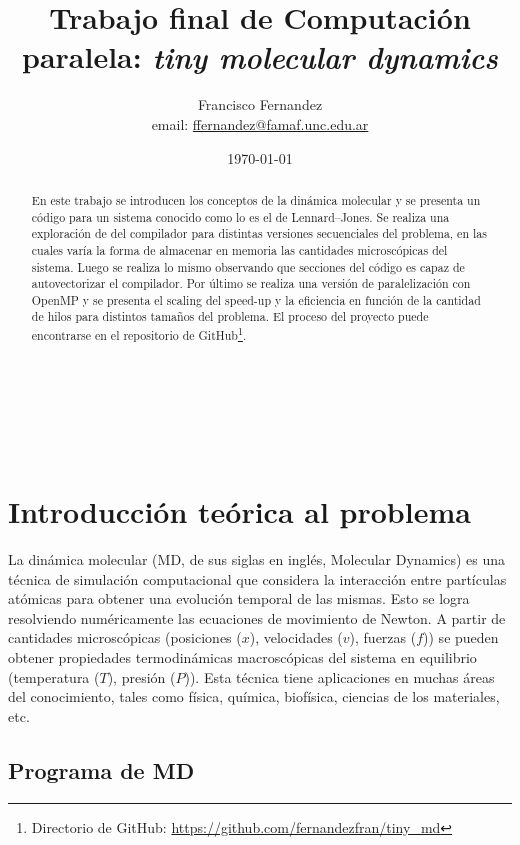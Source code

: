 \documentclass[a4paper,spanish,12pt,twoside]{article}
\title{Trabajo final de Computación paralela: \textit{tiny molecular dynamics}}
\author{Francisco Fernandez \\ \small{email: \href{mailto:ffernandez@famaf.unc.edu.ar}{ffernandez@famaf.unc.edu.ar}}}
\date{\today}
\begin{document}
\maketitle

\

\

\begin{abstract}

En este trabajo se introducen los conceptos de la dinámica molecular y se presenta un código para un sistema conocido como lo es el de Lennard--Jones. Se realiza una exploración de  del compilador  para distintas versiones secuenciales del problema, en las cuales varía la forma de almacenar en memoria las cantidades microscópicas del sistema. Luego se realiza lo mismo observando que secciones del código es capaz de autovectorizar el compilador. Por último se realiza una versión de paralelización con OpenMP y se presenta el scaling del speed-up y la eficiencia en función de la cantidad de hilos para distintos tamaños del problema. El proceso del proyecto puede encontrarse en el repositorio de GitHub\footnote{Directorio de GitHub: \url{https://github.com/fernandezfran/tiny_md}}.%


\end{abstract}


\section{Introducción teórica al problema}

La dinámica molecular (MD, de sus siglas en inglés, Molecular Dynamics) es una técnica de simulación computacional que considera la interacción entre partículas atómicas para obtener una evolución temporal de las mismas. Esto se logra resolviendo numéricamente las ecuaciones de movimiento de Newton. A partir de cantidades microscópicas (posiciones ($x$), velocidades ($v$), fuerzas ($f$)) se pueden obtener propiedades termodinámicas macroscópicas del sistema en equilibrio (temperatura ($T$), presión ($P$)). Esta técnica tiene aplicaciones en muchas áreas del conocimiento, tales como física, química, biofísica, ciencias de los materiales, etc.

\subsection{Programa de MD}
\end{document}
